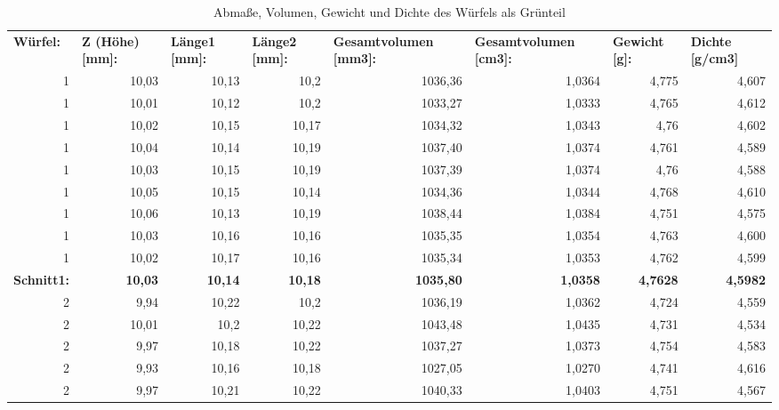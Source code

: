\begin{table}[htbp]
    \centering
    \caption{Abmaße, Volumen, Gewicht und Dichte des Würfels als Grünteil}
      \begin{tabular}{lrrrrrrr}
      \toprule
      \textbf{Würfel:} & \multicolumn{1}{l}{\textbf{Z (Höhe) [mm]:}} & \multicolumn{1}{l}{\textbf{Länge1 [mm]:}} & \multicolumn{1}{l}{\textbf{Länge2 [mm]:}} & \multicolumn{1}{l}{\textbf{Gesamtvolumen [mm3]:}} & \multicolumn{1}{l}{\textbf{Gesamtvolumen [cm3]:}} & \multicolumn{1}{l}{\textbf{Gewicht [g]:}} & \multicolumn{1}{l}{\textbf{Dichte [g/cm3]}} \\
      \multicolumn{1}{r}{1} & 10,03 & 10,13 & 10,2  & 1036,36 & 1,0364 & 4,775 & 4,607 \\
      \multicolumn{1}{r}{1} & 10,01 & 10,12 & 10,2  & 1033,27 & 1,0333 & 4,765 & 4,612 \\
      \multicolumn{1}{r}{1} & 10,02 & 10,15 & 10,17 & 1034,32 & 1,0343 & 4,76  & 4,602 \\
      \multicolumn{1}{r}{1} & 10,04 & 10,14 & 10,19 & 1037,40 & 1,0374 & 4,761 & 4,589 \\
      \multicolumn{1}{r}{1} & 10,03 & 10,15 & 10,19 & 1037,39 & 1,0374 & 4,76  & 4,588 \\
      \multicolumn{1}{r}{1} & 10,05 & 10,15 & 10,14 & 1034,36 & 1,0344 & 4,768 & 4,610 \\
      \multicolumn{1}{r}{1} & 10,06 & 10,13 & 10,19 & 1038,44 & 1,0384 & 4,751 & 4,575 \\
      \multicolumn{1}{r}{1} & 10,03 & 10,16 & 10,16 & 1035,35 & 1,0354 & 4,763 & 4,600 \\
      \multicolumn{1}{r}{1} & 10,02 & 10,17 & 10,16 & 1035,34 & 1,0353 & 4,762 & 4,599 \\
      \textbf{Schnitt1:} & \textbf{10,03} & \textbf{10,14} & \textbf{10,18} & \textbf{1035,80} & \textbf{1,0358} & \textbf{4,7628} & \textbf{4,5982} \\
      \midrule
      \multicolumn{1}{r}{2} & 9,94  & 10,22 & 10,2  & 1036,19 & 1,0362 & 4,724 & 4,559 \\
      \multicolumn{1}{r}{2} & 10,01 & 10,2  & 10,22 & 1043,48 & 1,0435 & 4,731 & 4,534 \\
      \multicolumn{1}{r}{2} & 9,97  & 10,18 & 10,22 & 1037,27 & 1,0373 & 4,754 & 4,583 \\
      \multicolumn{1}{r}{2} & 9,93  & 10,16 & 10,18 & 1027,05 & 1,0270 & 4,741 & 4,616 \\
      \multicolumn{1}{r}{2} & 9,97  & 10,21 & 10,22 & 1040,33 & 1,0403 & 4,751 & 4,567 \\

\end{tabular}
\end{table}
